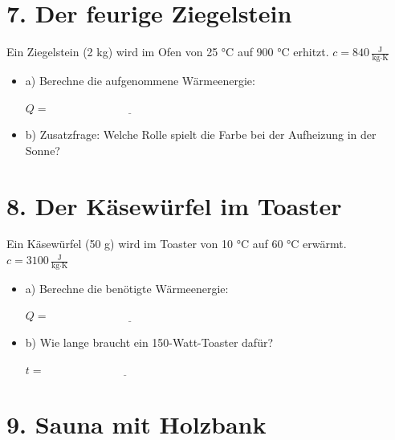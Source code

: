 \documentclass[a4paper]{article}
\begin{document}
\hrulefill

\section*{7. Der feurige Ziegelstein }

Ein Ziegelstein (2 kg) wird im Ofen von 25 °C auf 900 °C erhitzt.  
\( c = 840\, \frac{\text{J}}{\text{kg}\cdot\text{K}} \)

\begin{itemize}
	\item a) Berechne die aufgenommene Wärmeenergie:
	
	\vspace{1em}
	\( Q = \underline{\hspace{6cm}} \)
	
	\item b) Zusatzfrage: Welche Rolle spielt die Farbe bei der Aufheizung in der Sonne?
	
	\vspace{1em}
	\underline{\hspace{12cm}}
\end{itemize}

\hrulefill

\section*{8. Der Käsewürfel im Toaster }

Ein Käsewürfel (50 g) wird im Toaster von 10 °C auf 60 °C erwärmt.  
\( c = 3100\, \frac{\text{J}}{\text{kg}\cdot\text{K}} \)

\begin{itemize}
	\item a) Berechne die benötigte Wärmeenergie:
	
	\vspace{1em}
	\( Q = \underline{\hspace{6cm}} \)
	
	\item b) Wie lange braucht ein 150-Watt-Toaster dafür?
	
	\vspace{1em}
	\( t = \underline{\hspace{6cm}} \)
\end{itemize}

\hrulefill

\section*{9. Sauna mit Holzbank }
\end{document}
